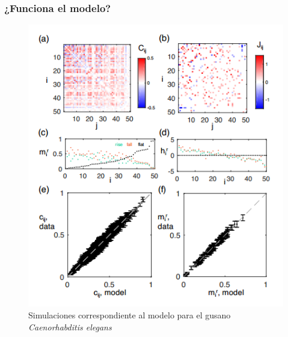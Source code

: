 \documentclass{beamer}
\begin{document}
\begin{frame}
\frametitle{¿Funciona el modelo?}
\begin{figure}
\centering
\includegraphics[scale=0.3]{fig/simulacioncelegans.png}
\caption{Simulaciones correspondiente al modelo para el gusano \textit{Caenorhabditis elegans}}
\end{figure}
\end{frame}
\end{document}

